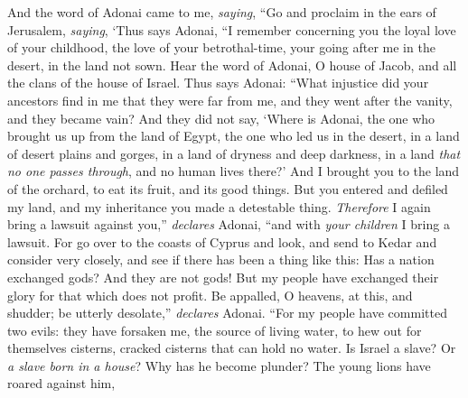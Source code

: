 \begin{biblechapter} %
 And the word of Adonai came to me, \textit{saying},
\verse “Go and proclaim in the ears of Jerusalem, \textit{saying}, ‘Thus says Adonai,
\verse “I remember concerning you the loyal love of your childhood, 
the love of your betrothal-time, 
your going after me in the desert, 
in the land not sown.
 Hear the word of Adonai, O house of Jacob, and all the clans of the house of Israel.
\verse Thus says Adonai:
\verse “What injustice did your ancestors find in me 
that they were far from me, 
and they went after the vanity, 
and they became vain?
\verse And they did not say, 
‘Where is Adonai, 
the one who brought us up from the land of Egypt, 
the one who led us in the desert, 
in a land of desert plains and gorges, 
in a land of dryness and deep darkness, 
in a land \textit{that no one passes through}, 
and no human lives there?’
\verse And I brought you to the land of the orchard, 
to eat its fruit, and its good things. 
But you entered and defiled my land, 
and my inheritance you made a detestable thing.
 \textit{Therefore} I again bring a lawsuit against you,” \textit{declares} Adonai, 
“and with \textit{your children} I bring a lawsuit.
\verse For go over to the coasts of Cyprus and look, 
and send to Kedar and consider very closely, 
and see if there has been a thing like this:
\verse Has a nation exchanged gods? And they are not gods! 
But my people have exchanged their glory for that which does not profit.
\verse Be appalled, O heavens, at this, and shudder; 
be utterly desolate,” \textit{declares} Adonai.
\verse “For my people have committed two evils: 
they have forsaken me, the source of living water, 
to hew out for themselves cisterns, cracked cisterns that can hold no water.
\verse Is Israel a slave? Or \textit{a slave born in a house}? 
Why has he become plunder?
\verse The young lions have roared against him, 

\end{biblechapter}
